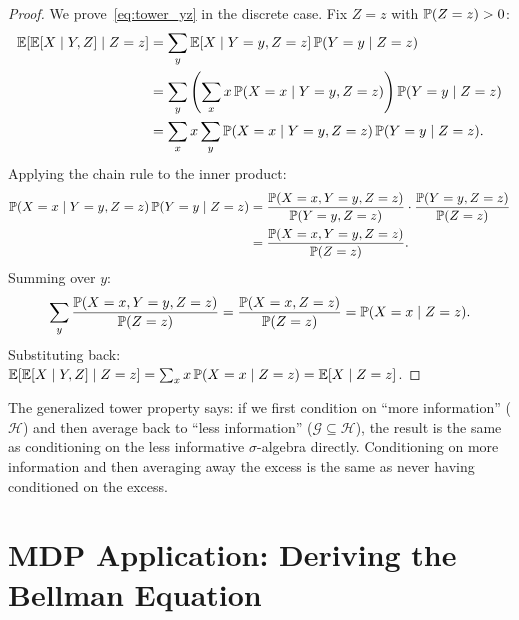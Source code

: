\documentclass[11pt,a4paper]{article}
\begin{document}
\begin{proof}
We prove~\eqref{eq:tower_yz} in the discrete case.  Fix $Z = z$
with $\mathbb{P}(Z = z) > 0$:
\begin{align}
  \mathbb{E}\!\left[\mathbb{E}[X \mid Y, Z] \;\middle|\; Z = z\right]
  &= \sum_y \mathbb{E}[X \mid Y = y, Z = z]\, \mathbb{P}(Y = y \mid Z = z)
  \nonumber\\
  &= \sum_y \left(\sum_x x\,
    \mathbb{P}(X = x \mid Y = y, Z = z)\right)
    \mathbb{P}(Y = y \mid Z = z)
  \nonumber\\
  &= \sum_x x \sum_y
    \mathbb{P}(X = x \mid Y = y, Z = z)\, \mathbb{P}(Y = y \mid Z = z).
  \label{eq:tower_gen_step1}
\end{align}
Applying the chain rule to the inner product:
\begin{align}
  \mathbb{P}(X = x \mid Y = y, Z = z)\, \mathbb{P}(Y = y \mid Z = z)
  &= \frac{\mathbb{P}(X = x, Y = y, Z = z)}{\mathbb{P}(Y = y, Z = z)}
    \cdot \frac{\mathbb{P}(Y = y, Z = z)}{\mathbb{P}(Z = z)}
  \nonumber\\
  &= \frac{\mathbb{P}(X = x, Y = y, Z = z)}{\mathbb{P}(Z = z)}.
  \label{eq:tower_gen_chain}
\end{align}
Summing over $y$:
\begin{equation}
  \sum_y \frac{\mathbb{P}(X = x, Y = y, Z = z)}{\mathbb{P}(Z = z)}
  = \frac{\mathbb{P}(X = x, Z = z)}{\mathbb{P}(Z = z)}
  = \mathbb{P}(X = x \mid Z = z).
  \label{eq:tower_gen_marginalize}
\end{equation}
Substituting back:
$\mathbb{E}[\mathbb{E}[X \mid Y, Z] \mid Z = z]
= \sum_x x\, \mathbb{P}(X = x \mid Z = z)
= \mathbb{E}[X \mid Z = z]$.
\end{proof}

\begin{remark}
The generalized tower property says: if we first condition on
``more information'' ($\mathcal{H}$) and then average back to
``less information'' ($\mathcal{G} \subseteq \mathcal{H}$), the
result is the same as conditioning on the less informative
$\sigma$-algebra directly.  Conditioning on more information and
then averaging away the excess is the same as never having
conditioned on the excess.
\end{remark}


\section{MDP Application: Deriving the Bellman Equation}
\label{sec:bellman}
\end{document}
